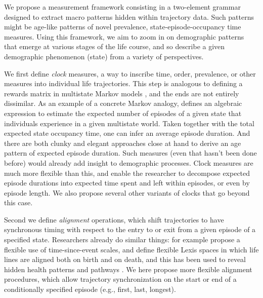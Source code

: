 \documentclass{article}
\begin{document}
% 
% 
% 
% 
We propose a measurement framework consisting in a two-element grammar designed to extract macro patterns hidden within trajectory data. Such patterns might be age-like patterns of novel prevalence, state-episode-occupancy time measures. Using this framework, we aim to zoom in on demographic patterns that emerge at various stages of the life course, and so describe a given demographic phenomenon (state) from a variety of perspectives. 

We first define \emph{clock} measures, a way to inscribe time, order, prevalence, or other measures into individual life trajectories. This step is analogous to defining a rewards matrix in multistate Markov models \citep[see e.g.][]{caswell2018matrix}, and the ends are not entirely dissimilar. As an example of a concrete Markov analogy, \citet{dudel2017b} defines an algebraic expression to estimate the expected number of episodes of a given state that individuals experience in a given multistate world. Taken together with the total expected state occupancy time, one can infer an average episode duration. And there are both clunky and elegant approaches close at hand to derive an age pattern of expected episode duration. Such measures (even that hasn't been done before) would already add insight to demographic processes. Clock measures are much more flexible than this, and enable the researcher to decompose expected episode durations into expected time spent and left within episodes, or even by episode length. We also propose several other variants of clocks that go beyond this case.

Second we define \emph{alignment} operations, which shift trajectories to have synchronous timing with respect to the entry to or exit from a given episode of a specified state. Researchers already do similar things: for example \citet{iacobelli2013multiple} propose a flexible use of time-since-event scales, and \citet{riffe2017unified} define flexible Lexis spaces in which life lines are aligned both on birth and on death, and this has been used to reveal hidden health patterns \citep{riffe2016time} and pathways \citep{potente2018disability, raab2018pathways}. We here propose more flexible alignment procedures, which allow trajectory synchronization on the start or end of a conditionally specified episode (e.g., first, last, longest).
\end{document}
